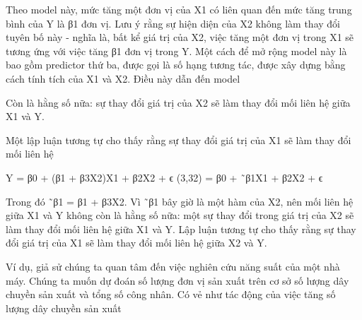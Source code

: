 Theo model này, mức tăng một đơn vị của X1 có liên quan đến mức tăng trung bình của Y là β1 đơn vị. Lưu ý rằng sự hiện diện của X2 không làm thay đổi tuyên bố này - nghĩa là, bất kể giá trị của X2, việc tăng một đơn vị trong X1 sẽ tương ứng với việc tăng β1 đơn vị trong Y. Một cách để mở rộng model này là bao gồm predictor thứ ba, được gọi là số hạng tương tác, được xây dựng bằng cách tính tích của X1 và X2. Điều này dẫn đến model

Còn là hằng số nữa: sự thay đổi giá trị của X2 sẽ làm thay đổi mối liên hệ giữa X1 và Y.

Một lập luận tương tự cho thấy rằng sự thay đổi giá trị của X1 sẽ làm thay đổi mối liên hệ

Y = β0 + (β1 + β3X2)X1 + β2X2 + ϵ (3,32) = β0 + ˜β1X1 + β2X2 + ϵ

Trong đó ˜β1 = β1 + β3X2. Vì ˜β1 bây giờ là một hàm của X2, nên mối liên hệ giữa X1 và Y không còn là hằng số nữa: một sự thay đổi trong giá trị của X2 sẽ làm thay đổi mối liên hệ giữa X1 và Y. Lập luận tương tự cho thấy rằng sự thay đổi giá trị của X1 sẽ làm thay đổi mối liên hệ giữa X2 và Y.

Ví dụ, giả sử chúng ta quan tâm đến việc nghiên cứu năng suất của một nhà máy. Chúng ta muốn dự đoán số lượng đơn vị sản xuất trên cơ sở số lượng dây chuyền sản xuất và tổng số công nhân. Có vẻ như tác động của việc tăng số lượng dây chuyền sản xuất

